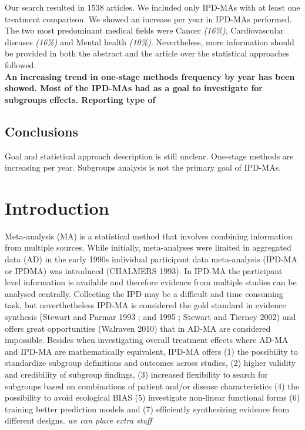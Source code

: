 \documentclass[]{article}
\begin{document}
Our search resulted in 1538 articles. We included only IPD-MAs with at
least one treatment comparison. We showed an increase per year in
IPD-MAs performed. The two most predominant medical fields were Cancer
\emph{(16\%)}, Cardiovascular diseases \emph{(16\%)} and Mental health
\emph{(10\%)}. Nevertheless, more information should be provided in both
the abstract and the article over the statistical approaches followed.\\
\textbf{An increasing trend in one-stage methods frequency by year has
been showed. Most of the IPD-MAs had as a goal to investigate for
subgroups effects. Reporting type of }

\hypertarget{conclusions}{%
\subsection{Conclusions}\label{conclusions}}

Goal and statistical approach description is still unclear. One-stage
methods are increasing per year. Subgroups analysis is not the primary
goal of IPD-MAs.

\newpage

\hypertarget{introduction}{%
\section{Introduction}\label{introduction}}

Meta-analysis (MA) is a statistical method that involves combining
information from multiple sources. While initially, meta-analyses were
limited in aggregated data (AD) in the early 1990s individual
participant data meta-analysis (IPD-MA or IPDMA) was introduced
(CHALMERS 1993). In IPD-MA the participant level information is
available and therefore evidence from multiple studies can be analysed
centrally. Collecting the IPD may be a difficult and time consuming
task, but neverthetheless IPD-MA is considered the gold standard in
evidence synthesis (Stewart and Parmar 1993 ; and 1995 ; Stewart and
Tierney 2002) and offers great opportunities (Walraven 2010) that in
AD-MA are considered impossible. Besides when investigating overall
treatment effects where AD-MA and IPD-MA are mathematically equivalent,
IPD-MA offers (1) the possibility to standardize subgroup definitions
and outcomes across studies, (2) higher validity and credibility of
subgroup findings, (3) increased flexibility to search for subgroups
based on combinations of patient and/or disease characteristics (4) the
possibility to avoid ecological BIAS (5) investigate non-linear
functional forms (6) training better prediction models and (7)
efficiently synthesizing evidence from different designs. \emph{we can
place extra stuff}
\end{document}
